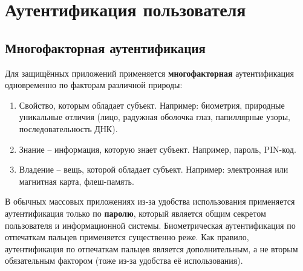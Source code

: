 \documentclass[10pt,a4paper,openany]{book}
\begin{document}





\chapter{Аутентификация пользователя}


\section{Многофакторная аутентификация}

Для защищённых приложений применяется \textbf{многофакторная} аутентификация одновременно по факторам различной природы:
\begin{enumerate}
    \item Свойство, которым обладает субъект. Например: биометрия, природные уникальные отличия (лицо, радужная оболочка глаз, папиллярные узоры, последовательность ДНК).
    \item Знание -- информация, которую знает субъект. Например, пароль, PIN-код.
    \item Владение -- вещь, которой обладает субъект. Например: электронная или магнитная карта, флеш-память.
\end{enumerate}

В обычных массовых приложениях из-за удобства использования применяется аутентификация только по \textbf{паролю}, который является общим секретом пользователя и информационной системы. Биометрическая аутентификация по отпечаткам пальцев применяется существенно реже. Как правило, аутентификация по отпечаткам пальцев является дополнительным, а не вторым обязательным фактором (тоже из-за удобства её использования).

\end{document}
